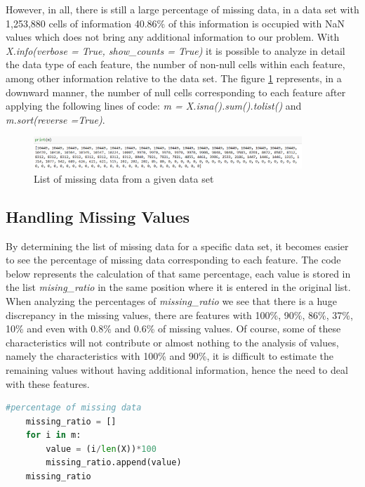 However, in all, there is still a large percentage of missing data, in a data set with 1,253,880 cells of information 40.86\% of this information is occupied with NaN values which does not bring any additional information to our problem. With \textit{X.info(verbose = True, show\_counts = True)} it is possible to analyze in detail the data type of each feature, the number of non-null cells within each feature, among other information relative to the data set. The figure \ref{fig:missing_values} represents, in a downward manner, the number of null cells corresponding to each feature after applying the following lines of code: \textit{m = X.isna().sum().tolist()} and \textit{m.sort(reverse =True)}. 

\begin{figure}[h]
    \centering
    \includegraphics[width=0.9\textwidth,height=0.1\textheight]{Chapters/Figures/missing_values.png}
    \caption{List of missing data from a given data set}
    \label{fig:missing_values}
\end{figure}




\subsection{Handling Missing Values} %
\label{sec:handling_missing values}
\hspace{10px}By determining the list of missing data for a specific data set, it becomes easier to see the percentage of missing data corresponding to each feature. The code below represents the calculation of that same percentage, each value is stored in the list \textit{mising\_ratio} in the same position where it is entered in the original list. When analyzing the percentages of \textit{missing\_ratio} we see that there is a huge discrepancy in the missing values, there are features with 100\%, 90\%, 86\%, 37\%, 10\% and even with 0.8\% and 0.6\% of missing values. Of course, some of these characteristics will not contribute or almost nothing to the analysis of values, namely the characteristics with 100\% and 90\%, it is difficult to estimate the remaining values without having additional information, hence the need to deal with these features.
\begin{lstlisting}[language=Python]
    #percentage of missing data 
    missing_ratio = []
    for i in m:
        value = (i/len(X))*100
        missing_ratio.append(value)
    missing_ratio
\end{lstlisting}

